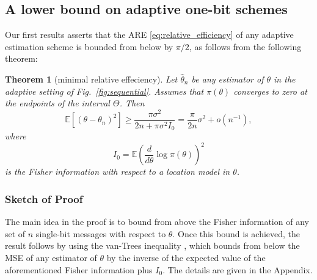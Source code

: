\documentclass[letterpaper, conference]{IEEEtran}      %
\newtheorem{thm}{\bf{Theorem}}
\begin{document}

\subsection{A lower bound on adaptive one-bit schemes}
Our first results asserts that the ARE \eqref{eq:relative_efficiency} of any adaptive estimation scheme is bounded from below by $\pi/2$, as follows from the following theorem:
\begin{thm}[minimal relative effeciency] \label{thm:adpative_lower_bound}
Let $\widehat{\theta}_n$ be any estimator of $\theta$ in the adaptive setting of Fig.~\ref{fig:sequential}.
Assumes that $\pi(\theta)$ converges to zero at the endpoints of the interval $\Theta$. Then
\[
\mathbb E\left[ (\theta-\theta_n)^2 \right] \geq  \frac{\pi \sigma^2 }{2n +\pi \sigma^2  I_0}  =  \frac{\pi}{2n}\sigma^2+o(n^{-1}),
\]
where 
\[
I_0 = \mathbb E \left( \frac{d}{d\theta} \log \pi (\theta) \right)^2
\]
is the Fisher information with respect to a location model in $\theta$. 
\end{thm}

\subsubsection*{Sketch of Proof}
The main idea in the proof is to bound from above the Fisher information of any set of $n$ single-bit messages with respect to $\theta$. Once this bound is achieved, the result follows by using the van-Trees inequality \cite[Thm. 2.13]{tsybakov2008introduction},\cite{gill1995applications} which bounds from below the MSE of any estimator of $\theta$ by the inverse of the expected value of the aforementioned Fisher information plus $I_0$. The details are given in the Appendix.\\
\end{document}
